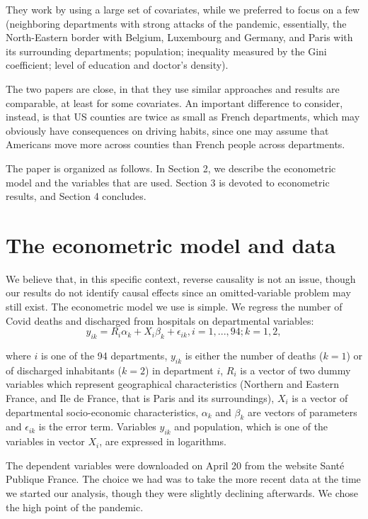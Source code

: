 \documentclass[a4paper]{article}
\theoremstyle{plain}
\theoremstyle{definition}
\begin{document}
They work by using a large set of covariates, while we preferred to focus on a few (neighboring departments with strong attacks of the pandemic, essentially, the North-Eastern border with Belgium, Luxembourg and Germany, and Paris with its surrounding departments; population; inequality measured by the Gini coefficient; level of education and doctor's density).

The two papers are close, in that they use similar approaches and results are comparable, at least for some covariates. An important difference to consider, instead, is that US counties are twice as small as French departments, which may obviously have consequences on driving habits, since one may assume that Americans move more across counties than French people across departments.

The paper is organized as follows. In Section 2, we describe the econometric model and the variables that are used. Section 3 is devoted to econometric results, and  Section 4 concludes. 

\section{The econometric model and data}

We believe that, in this specific context, reverse causality is not an issue, though our results do not identify causal effects since an omitted-variable problem may still exist. The econometric model we use is simple. We regress the number of Covid deaths and discharged from hospitals on departmental variables:
$$y_{ik}= R_i\alpha_k + X_i\beta_k + \epsilon_{ik}, i =1,..., 94; k= 1,2, $$ 

\noindent where $i$ is one of the 94 departments, $y_{ik}$ is either the number of deaths ($k=1$) or of discharged inhabitants ($k=2$) in department $i$, $R_i$ is a vector of two dummy variables which represent geographical characteristics (Northern and Eastern France, and Ile de France, that is Paris and its surroundings), $X_i$ is a vector of departmental socio-economic characteristics, $\alpha_k$ and $\beta_k$ are vectors of parameters and $\epsilon_{ik}$ is the error term. Variables $y_{ik}$ and population, which is one of the variables in vector $X_i$, are expressed in logarithms.

The dependent variables were downloaded  on April 20 from the website  Sant\'e Publique France. The choice we had was to take the more recent data at the time we started our analysis, though they were slightly declining afterwards. We chose the high point of the pandemic.
\end{document}
